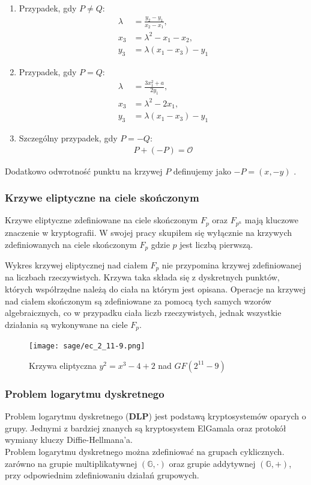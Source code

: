 \begin{enumerate}
    \item Przypadek, gdy \( P \neq Q \):
          \begin{align}
              \lambda & = \frac{y_2 - y_1}{x_2 - x_1}, \\
              x_3     & = \lambda^2 - x_1 - x_2,       \\
              y_3     & = \lambda(x_1 - x_3) - y_1
          \end{align}
    \item Przypadek, gdy \( P = Q \):
          \begin{align*}
              \lambda & = \frac{3x_1^2 + a}{2y_1}, \\
              x_3     & = \lambda^2 - 2x_1,        \\
              y_3     & = \lambda(x_1 - x_3) - y_1
          \end{align*}
    \item Szczególny przypadek, gdy \( P = -Q \):
          \begin{align*}
              P + (-P) = \mathcal{O}
          \end{align*}
\end{enumerate}
Dodatkowo odwrotność punktu na krzywej $P$ definujemy jako $-P = (x, -y)$ \cite{Stinson2021}.


\subsubsection{Krzywe eliptyczne na ciele skończonym}
Krzywe eliptyczne zdefiniowane na ciele skończonym $F_p$ oraz $F_{p^n}$ mają kluczowe znaczenie w kryptografii.
W swojej pracy skupiłem się wyłącznie na krzywych zdefiniowanych na ciele skończonym $F_p$ gdzie $p$ jest liczbą pierwszą.
\par
Wykres krzywej eliptycznej nad ciałem $F_p$ nie przypomina krzywej zdefiniowanej na liczbach rzeczywistych.
Krzywa taka składa się z dyskretnych punktów, których współrzędne należą do ciała
na którym jest opisana.
Operacje na krzywej nad ciałem skończonym są zdefiniowane
za pomocą tych samych wzorów algebraicznych, co w przypadku ciała liczb rzeczywistych,
jednak wszystkie działania są wykonywane na ciele $F_p$.
\begin{figure}[!h]
    \centering \texttt{[image: sage/ec\_2\_11-9.png]}
    \caption{Krzywa eliptyczna $y^2=x^3-4+2$ nad $GF(2^{11} - 9)$}
\end{figure}


\subsubsection{Problem logarytmu dyskretnego}
Problem logarytmu dyskretnego (\textbf{DLP}) jest
podstawą kryptosystemów oparych o grupy.
Jednymi z bardziej znanych są kryptosystem ElGamala oraz protokół wymiany
kluczy Diffie-Hellmana'a.
\\ Problem logarytmu dyskretnego można zdefiniować na grupach cyklicznych.
zarówno na grupie multiplikatywnej $(\mathbb{G},\cdot)$
oraz grupie addytywnej $(\mathbb{G}, +)$, przy odpowiednim zdefiniowaniu działań grupowych.

